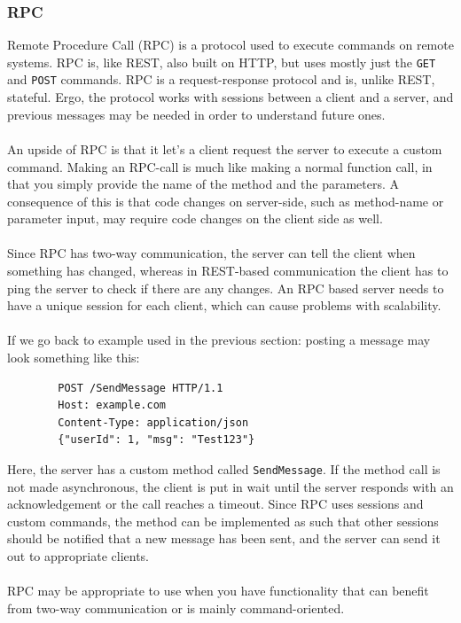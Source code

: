\documentclass{cslthse-msc}
\begin{document}
    \subsubsection{RPC}

    Remote Procedure Call (RPC) is a protocol used to execute commands on remote systems. RPC is, like REST, also
    built on HTTP, but uses mostly just the \texttt{GET} and \texttt{POST} commands. RPC is a request-response protocol and is, unlike
    REST, stateful. Ergo, the protocol works with sessions between a client and a server, and previous messages may
    be needed in order to understand future ones.
    \\ \\
    An upside of RPC is that it let's a client request the server to execute
    a custom command. Making an RPC-call is much like making a normal
    function call, in that you simply provide the name of the method and the
    parameters. A consequence of this is that code changes on server-side,
    such as method-name or parameter input, may require code changes on the
    client side as well.
    \\ \\
    Since RPC has two-way communication, the server can tell the client when
    something has changed, whereas in REST-based communication the client
    has to ping the server to check if there are any changes. An RPC based
    server needs to have a unique session for each client, which can cause
    problems with scalability.
    \\ \\
    If we go back to example used in the previous section: posting a message
    may look something like this:

    \begin{lstlisting}
        POST /SendMessage HTTP/1.1
        Host: example.com
        Content-Type: application/json
        {"userId": 1, "msg": "Test123"}
    \end{lstlisting}

    Here, the server has a custom method called \texttt{SendMessage}. If the
    method call is not made asynchronous, the client is put in wait until
    the server responds with an acknowledgement or the call reaches a
    timeout. Since RPC uses sessions and custom commands, the method can be
    implemented as such that other sessions should be notified that a new
    message has been sent, and the server can send it out to appropriate
    clients.
    \\ \\
    RPC may be appropriate to use when you have functionality that can
    benefit from two-way communication or is mainly command-oriented.
\end{document}
